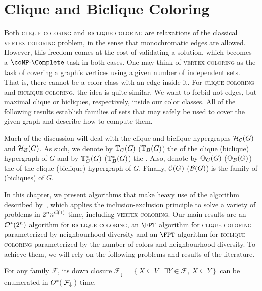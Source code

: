 \section{Clique and Biclique Coloring}

Both \textsc{clique coloring} and \textsc{biclique coloring} are relaxations of the classical \textsc{vertex coloring} problem, in the sense that monochromatic edges are allowed.
However, this freedom comes at the cost of validating a solution, which becomes a $\coNP\text{-}\Complete$ task in both cases.
One may think of \textsc{vertex coloring} as the task of covering a graph's vertices using a given number of independent sets.
That is, there cannot be a color class with an edge inside it.
For \textsc{clique coloring} and \textsc{biclique coloring}, the idea is quite similar.
We want to forbid not edges, but maximal clique or bicliques, respectively, inside our color classes.
All of the following results establish families of sets that may safely be used to cover the given graph and describe how to compute them.

Much of the discussion will deal with the clique and biclique hypergraphs $\mathcal{H}_{\mathcal{C}}(G)$ and $\mathcal{H}_{\mathcal{B}}(G)$.
As such, we denote by $\mathbb{T}_{C}(G)$ ($\mathbb{T}_{B}(G)$) the  of the clique (biclique) hypergraph of $G$ and by $\mathbb{T}^*_{C}(G)$ ($\mathbb{T}^*_{B}(G)$) the .
Also, denote by $\mathbb{O}_{C}(G)$ ($\mathbb{O}_{B}(G)$) the  of the clique (biclique) hypergraph of $G$.
Finally, $\mathcal{C}(G)$ ($\mathcal{B}(G)$) is the family of  (bicliques) of $G$.

In this chapter, we present algorithms that make heavy use of the algorithm described by~\cite{inclusion_exclusion}, which applies the inclusion-exclusion principle to solve a variety of problems in $2^nn^{\mathcal{O}\!\left(1\right)}$ time, including \textsc{vertex coloring}.
Our main results are an $\mathcal{O}^*\!\left(2^n\right)$ algorithm for \textsc{biclique coloring}, an $\FPT$ algorithm for \textsc{clique coloring} parameterized by neighbourhood diversity and an $\FPT$ algorithm for \textsc{biclique coloring} parameterized by the number of colors and neighbourhood diversity.
To achieve them, we will rely on the following problems and results of the literature.

\begin{lemma}
    \label{lem:down_closure}
    For any family $\mathcal{F}$, its down closure $\mathcal{F}_{\downarrow} = \left\{X \subseteq V \mid \exists Y \in \mathcal{F},\ X \subseteq Y\right\}$ can be enumerated in $O^*(|\mathcal{F}_{\downarrow}|)$ time.
\end{lemma}

